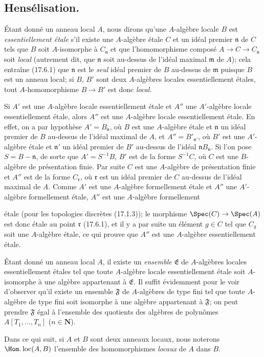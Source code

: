 \subsection{Hensélisation.}

\begin{env}[18.6.1]
Étant donné un anneau local $A$, nous dirons qu'une $A$-algèbre locale $B$ est \emph{essentiellement étale} s'il existe une $A$-algèbre étale $C$ et un idéal premier $\mathfrak n$ de $C$ tels que $B$ soit $A$-isomorphe à $C_{\mathfrak n}$ et que l'homomorphisme composé $A\to C\to C_{\mathfrak n}$ soit \emph{local} (autrement dit, que $\mathfrak n$ soit au-dessus de l'idéal maximal $\mathfrak m$ de $A$); cela entraîne (17.6.1) que $\mathfrak n$ est le \emph{seul} idéal premier de $B$ au-dessus de $\mathfrak m$ puisque $B$ est un anneau local; si $B$, $B'$ sont deux $A$-algèbres locales essentiellement étales, tout $A$-homomorphisme $B\to B'$ est donc \emph{local}.

Si $A'$ est une $A$-algèbre locale essentiellement étale et $A''$ une $A'$-algèbre locale essentiellement étale, alors $A''$ est une $A$-algèbre locale essentiellement étale. En effet, on a par hypothèse $A'=B_{\mathfrak n}$, où $B$ est une $A$-algèbre étale et $\mathfrak n$ un idéal premier de $B$ au-dessus de l'idéal maximal de $A$, et $A''=B'_{\mathfrak n'}$, où $B'$ est une $A'$-algèbre étale et $\mathfrak n'$ un idéal premier de $B'$ au-dessus de l'idéal $\mathfrak nB_{\mathfrak n}$. Si l'on pose $S=B-\mathfrak n$, de sorte que $A'=S^{-1}B$, $B'$ est de la forme $S^{-1}C$, où $C$ est une $B$-algèbre de présentation finie. Par suite $C$ est une $A$-algèbre de présentation finie et $A''$ est de la forme $C_{\mathfrak r}$, où $\mathfrak r$ est un idéal premier de $C$ au-dessus de l'idéal maximal de $A$. Comme $A'$ est une $A$-algèbre formellement étale et $A''$ une $A'$-algèbre formellement étale, $A''$ est une $A$-algèbre formellement


étale (pour les topologies discrètes (17.1.3)); le morphisme $\Spec(C)\to\Spec(A)$ est donc étale au point $\mathfrak r$ (17.6.1), et il y a par suite un élément $g\in C$ tel que $C_g$ soit une $A$-algèbre étale, ce qui prouve que $A''$ est une $A$-algèbre essentiellement étale.

Étant donné un anneau local $A$, il existe un \emph{ensemble} $\mathfrak E$ de $A$-algèbres locales essentiellement étales tel que toute $A$-algèbre locale essentiellement étale soit $A$-isomorphe à une algèbre appartenant à $\mathfrak E$. Il suffit évidemment pour le voir d'observer qu'il existe un ensemble $\mathfrak F$ de $A$-algèbres de type fini tel que toute $A$-algèbre de type fini soit isomorphe à une algèbre appartenant à $\mathfrak F$; on peut prendre $\mathfrak F$ égal à l'ensemble des quotients des algèbres de polynômes $A[T_1,\ldots,T_n]$ ($n\in\mathbf N$).

Dans ce qui suit, si $A$ et $B$ sont deux anneaux locaux, nous noterons $\Hom.\operatorname{loc}(A,B)$ l'ensemble des homomorphismes \emph{locaux} de $A$ dans $B$.
\end{env}

